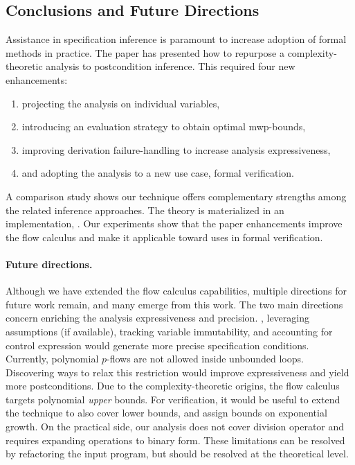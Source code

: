 \subsection{Conclusions and Future Directions}
\label{sec:pc-conclusion}

Assistance in specification inference is paramount to increase adoption of formal methods in practice.
The paper has presented how to repurpose a complexity-theoretic analysis to postcondition inference.
This required four new enhancements:

\begin{enumerate}[label=(\roman*)]
\item projecting the analysis on individual variables,
\item introducing an evaluation strategy to obtain optimal mwp-bounds,
\item improving derivation failure-handling to increase analysis expressiveness,
\item and adopting the analysis to a new use case, \ie formal verification.
\end{enumerate}

A comparison study shows our technique offers complementary strengths among the related inference approaches.
The theory is materialized in an implementation, \impl.
Our experiments show that the paper enhancements improve the flow calculus and make it applicable toward uses in formal verification.

\paragraph*{Future directions.}
Although we have extended the flow calculus capabilities, multiple directions for future work remain, and many emerge from this work.
The two main directions concern enriching the analysis expressiveness and precision.
\Eg, leveraging assumptions (if available), tracking variable immutability, and accounting for control expression would generate more precise specification conditions.
Currently, polynomial \(p\)-flows are not allowed inside unbounded loops.
Discovering ways to relax this restriction would improve expressiveness and yield more postconditions.
Due to the complexity-theoretic origins, the flow calculus targets polynomial \emph{upper} bounds.
For verification, it would be useful to extend the technique to also cover lower bounds, and assign bounds on exponential growth.
On the practical side, our analysis does not cover division operator and requires expanding operations to binary form.
These limitations can be resolved by refactoring the input program, but should be resolved at the theoretical level.

